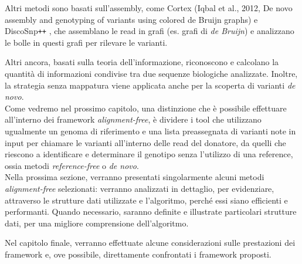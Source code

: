 \documentclass[../main.tex]{subfiles}
\begin{document}
Altri metodi sono basati sull'assembly, come Cortex (Iqbal et al., 2012, De novo assembly and genotyping of variants using colored de Bruijn graphs) e DiscoSnp\texttt{++} \cite{peterlongo2017discosnp++}, che assemblano le read in grafi (es. grafi di \textit{de Bruijn}) e analizzano le bolle in questi grafi per rilevare le varianti. 

Altri ancora, basati sulla teoria dell'informazione, riconoscono e calcolano la quantità di informazioni condivise tra due sequenze biologiche analizzate. Inoltre, la strategia senza mappatura viene applicata anche per la scoperta di varianti \textit{de novo}.\\


\noindent
Come vedremo nel prossimo capitolo, una distinzione che è possibile effettuare all'interno dei framework \textit{alignment-free}, è dividere i tool che utilizzano ugualmente un genoma di riferimento e una lista preassegnata di varianti note in input per chiamare le varianti all'interno delle read del donatore, da quelli che riescono a identificare e determinare il genotipo senza l'utilizzo di una reference, ossia metodi \textit{reference-free} o \textit{de novo}.\\



\noindent
Nella prossima sezione, verranno presentati singolarmente alcuni metodi \textit{alignment-free} selezionati: verranno analizzati in dettaglio, per evidenziare, attraverso le strutture dati utilizzate e l'algoritmo, perché essi siano efficienti e performanti. Quando necessario, saranno definite e illustrate particolari strutture dati, per una migliore comprensione dell'algoritmo.

Nel capitolo finale, verranno effettuate alcune considerazioni sulle prestazioni dei framework e, ove possibile, direttamente confrontati i framework proposti.


\end{document}

